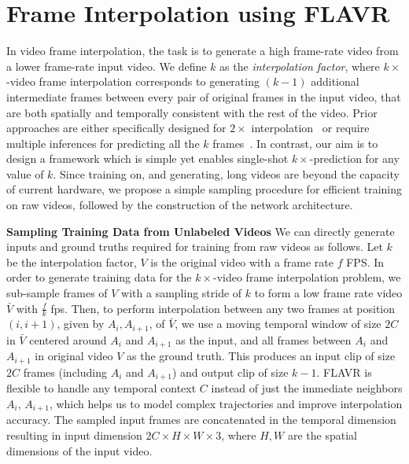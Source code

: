 \documentclass[10pt,twocolumn,letterpaper]{article}
\newcommand{\Ours}{FLAVR}
\newcommand{\twox}{$2\times$}
\newcommand{\stimes}{{\times}}
\begin{document}
\section{Frame Interpolation using \Ours{}}
\label{sec:arch_design}

In video frame interpolation, the task is to generate a high frame-rate video from a lower frame-rate input video. We define $k$ as the \textit{interpolation factor}, where $k\times$-video frame interpolation corresponds to generating $(k{-}1)$ additional intermediate frames between every pair of original frames in the input video, that are both spatially and temporally consistent with the rest of the video. Prior approaches are either specifically designed for \twox{} interpolation~\cite{choi2020channel, lee2020adacof, huang2020rife, tulyakov2021time, siyao2021deep} or require multiple inferences for predicting all the $k$ frames~\cite{xu2019quadratic, bao2019depth, bao2019memc, park2020bmbc}. In contrast, our aim is to design a framework which is simple yet enables single-shot $k\times$-prediction for any value of $k$. Since training on, and generating, long videos are beyond the capacity of current hardware, we propose a simple sampling procedure for efficient training on raw videos, followed by the construction of the network architecture.

{\bf Sampling Training Data from Unlabeled Videos} We can directly generate inputs and ground truths required for training from raw videos as follows. Let $k$ be the interpolation factor, $V$ is the original video with a frame rate $f$ FPS. In order to generate training data for the $k\times$-video frame interpolation problem, we sub-sample frames of $V$ with a sampling stride of $k$ to form a low frame rate video $\bar{V}$ with $\frac{f}{k}$ fps. Then, to perform interpolation between any two frames at position $(i,i{+}1)$, given by $ A_i , A_{i+1} $, of $\bar{V}$, we use a moving temporal window of size $2C$ in $\bar{V}$ centered around $A_i$ and $A_{i+1}$ as the input, and all frames between $A_i$ and $A_{i+1}$ in original video $V$ as the ground truth. This produces an input clip of size $2C$ frames (including $ A_i$ and $A_{i+1} $) and output clip of size $k{-}1$. 
\Ours{} is flexible to handle any temporal context $C$ instead of just the immediate neighbors $A_i$, $A_{i+1}$, which helps us to model complex trajectories and improve interpolation accuracy. 
The sampled input frames are concatenated in the temporal dimension resulting in input dimension $2C \stimes H \stimes W \stimes 3$, where $H,W$ are the spatial dimensions of the input video. 
\end{document}
